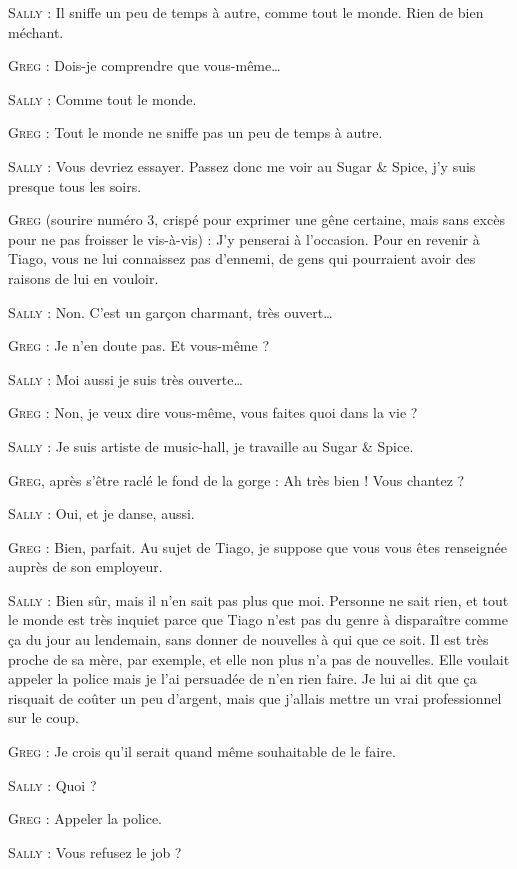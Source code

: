 \begin{dialogue}
\textsc{Sally} : Il sniffe un peu de temps à autre, comme tout le monde. Rien de bien méchant.

\textsc{Greg} : Dois-je comprendre que vous-même…

\textsc{Sally} : Comme tout le monde.

\textsc{Greg} : Tout le monde ne sniffe pas un peu de temps à autre.

\textsc{Sally} : Vous devriez essayer. Passez donc me voir au Sugar \& Spice, j’y suis presque tous les soirs.

\textsc{Greg} (sourire numéro 3, crispé pour exprimer une gêne certaine, mais sans excès pour ne pas froisser le vis-à-vis) : J’y penserai à l’occasion. Pour en revenir à Tiago, vous ne lui connaissez pas d’ennemi, de gens qui pourraient avoir des raisons de lui en vouloir.

\textsc{Sally} : Non. C’est un garçon charmant, très ouvert…

\textsc{Greg} : Je n’en doute pas. Et vous-même ?

\textsc{Sally} : Moi aussi je suis très ouverte…

\textsc{Greg} : Non, je veux dire vous-même, vous faites quoi dans la vie ?

\textsc{Sally} : Je suis artiste de music-hall, je travaille au Sugar \& Spice.

\textsc{Greg}, après s’être raclé le fond de la gorge : Ah très bien ! Vous chantez ?

\textsc{Sally} : Oui, et je danse, aussi.

\textsc{Greg} : Bien, parfait. Au sujet de Tiago, je suppose que vous vous êtes renseignée auprès de son employeur.

\textsc{Sally} : Bien sûr, mais il n’en sait pas plus que moi. Personne ne sait rien, et tout le monde est très inquiet parce que Tiago n’est pas du genre à disparaître comme ça du jour au lendemain, sans donner de nouvelles à qui que ce soit. Il est très proche de sa mère, par exemple, et elle non plus n’a pas de nouvelles. Elle voulait appeler la police mais je l’ai persuadée de n’en rien faire. Je lui ai dit que ça risquait de coûter un peu d’argent, mais que j’allais mettre un vrai professionnel sur le coup.

\textsc{Greg} : Je crois qu’il serait quand même souhaitable de le faire.

\textsc{Sally} : Quoi ?

\textsc{Greg} : Appeler la police.

\textsc{Sally} : Vous refusez le job ?


\end{dialogue}

